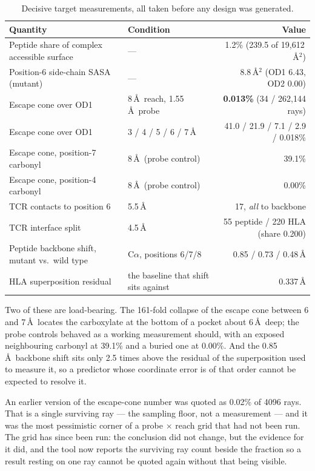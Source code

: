 \documentclass[11pt,a4paper]{article}
\begin{document}
\begin{table}[h]
\centering
\caption{Decisive target measurements, all taken before any design was generated.}
\small
\begin{tabular}{p{5.8cm}p{4.3cm}r}
\toprule
Quantity & Condition & Value \\
\midrule
Peptide share of complex accessible surface & --- & 1.2\% (239.5 of 19{,}612\,\AA$^2$) \\
Position-6 side-chain SASA (mutant) & --- & 8.8\,\AA$^2$ (OD1 6.43, OD2 0.00) \\
Escape cone over OD1 & 8\,\AA\ reach, 1.55\,\AA\ probe & \textbf{0.013\%} (34 / 262{,}144 rays) \\
Escape cone over OD1 & 3 / 4 / 5 / 6 / 7\,\AA & 41.0 / 21.9 / 7.1 / 2.9 / 0.018\% \\
Escape cone, position-7 carbonyl & 8\,\AA\ (probe control) & 39.1\% \\
Escape cone, position-4 carbonyl & 8\,\AA\ (probe control) & 0.00\% \\
TCR contacts to position 6 & 5.5\,\AA & 17, \emph{all} to backbone \\
TCR interface split & 4.5\,\AA & 55 peptide / 220 HLA (share 0.200) \\
Peptide backbone shift, mutant vs.\ wild type & C$\alpha$, positions 6/7/8 & 0.85 / 0.73 / 0.48\,\AA \\
HLA superposition residual & the baseline that shift sits against & 0.337\,\AA \\
\bottomrule
\end{tabular}
\end{table}

Two of these are load-bearing. The 161-fold collapse of the escape cone between 6 and 7\,\AA\
locates the carboxylate at the bottom of a pocket about 6\,\AA\ deep; the probe controls behaved
as a working measurement should, with an exposed neighbouring carbonyl at 39.1\% and a buried one
at 0.00\%. And the 0.85\,\AA\ backbone shift sits only 2.5 times above the residual of the
superposition used to measure it, so a predictor whose coordinate error is of that order cannot
be expected to resolve it.

An earlier version of the escape-cone number was quoted as 0.02\% of 4096 rays. That is a single
surviving ray --- the sampling floor, not a measurement --- and it was the most pessimistic
corner of a probe $\times$ reach grid that had not been run. The grid has since been run: the
conclusion did not change, but the evidence for it did, and the tool now reports the surviving
ray count beside the fraction so a result resting on one ray cannot be quoted again without
that being visible.
\end{document}
